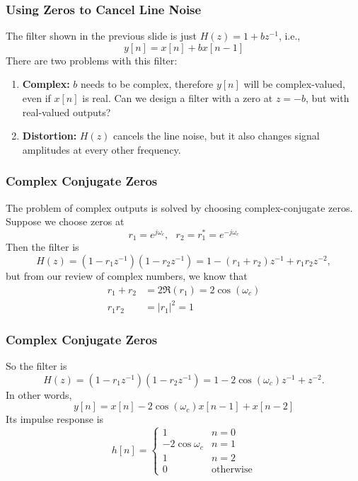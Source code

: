 \documentclass{beamer}
\begin{document}
\begin{frame}
  \frametitle{Using Zeros to Cancel Line Noise}
  The filter shown in the previous slide is just $H(z)=1+bz^{-1}$, i.e.,
  \begin{displaymath}
    y[n] = x[n] + bx[n-1]
  \end{displaymath}
  There are two problems with this filter:
  \begin{enumerate}
  \item {\bf Complex:} $b$ needs to be complex, therefore $y[n]$ will
    be complex-valued, even if $x[n]$ is real.  Can we design a filter
    with a zero at $z=-b$, but with real-valued outputs?
  \item {\bf Distortion:} $H(z)$ cancels the line noise, but it also
    changes signal amplitudes at every other frequency.
  \end{enumerate}
\end{frame}

\begin{frame}
  \frametitle{Complex Conjugate Zeros}

  The problem of complex outputs is solved by choosing
  complex-conjugate zeros.  Suppose we choose zeros at
  \begin{displaymath}
    r_1 = e^{j\omega_c},~~~r_2=r_1^*=e^{-j\omega_c}
  \end{displaymath}
  Then the filter is
  \begin{displaymath}
    H(z) = (1-r_1z^{-1})(1-r_2z^{-1}) = 1-(r_1+r_2)z^{-1} + r_1r_2z^{-2},
  \end{displaymath}
  but from our review of complex numbers, we know that
  \begin{align*}
    r_1+r_2 &= 2\Re(r_1) = 2\cos(\omega_c)\\
    r_1r_2 &= |r_1|^2 = 1
  \end{align*}
\end{frame}

\begin{frame}
  \frametitle{Complex Conjugate Zeros}
  
  So the filter is 
  \begin{displaymath}
    H(z) = (1-r_1z^{-1})(1-r_2z^{-1}) = 1-2\cos(\omega_c) z^{-1} + z^{-2}.
  \end{displaymath}
  In other words,
  \begin{displaymath}
    y[n] = x[n] - 2\cos(\omega_c)x[n-1] + x[n-2]
  \end{displaymath}
  Its impulse response is
  \begin{displaymath}
    h[n]=\begin{cases}
    1 & n=0\\
    -2\cos\omega_c & n=1\\
    1 & n=2\\
    0 & \mbox{otherwise}
    \end{cases}
  \end{displaymath}
\end{frame}
\end{document}

